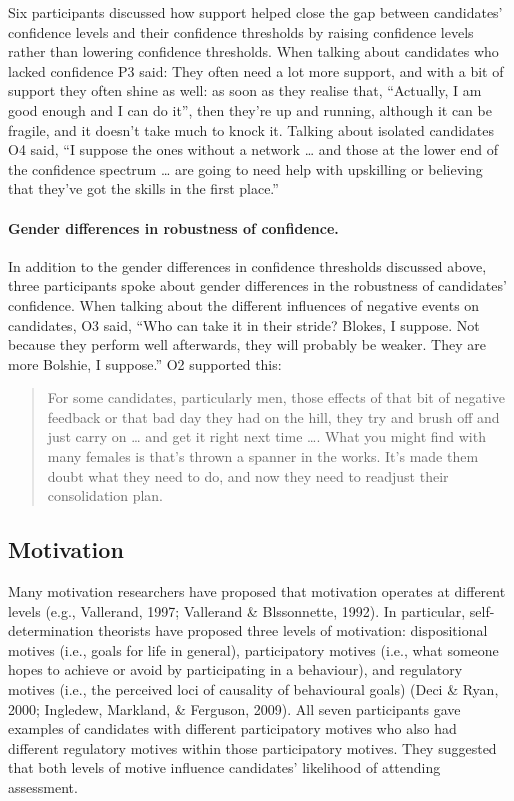 \documentclass[a4paper,]{book}
\let\oldparagraph\paragraph
\renewcommand{\paragraph}[1]{\oldparagraph{#1}\mbox{}}
\begin{document}
Six participants discussed how support helped close the gap between candidates' confidence levels and their confidence thresholds by raising confidence levels rather than lowering confidence thresholds. When talking about candidates who lacked confidence P3 said:
They often need a lot more support, and with a bit of support they often shine as well: as soon as they realise that, ``Actually, I am good enough and I can do it'', then they're up and running, although it can be fragile, and it doesn't take much to knock it.
Talking about isolated candidates O4 said, ``I suppose the ones without a network \ldots{} and those at the lower end of the confidence spectrum \ldots{} are going to need help with upskilling or believing that they've got the skills in the first place.''

\hypertarget{gender-differences-in-robustness-of-confidence.}{%
\paragraph{Gender differences in robustness of confidence.}\label{gender-differences-in-robustness-of-confidence.}}

In addition to the gender differences in confidence thresholds discussed above, three participants spoke about gender differences in the robustness of candidates' confidence. When talking about the different influences of negative events on candidates, O3 said, ``Who can take it in their stride? Blokes, I suppose. Not because they perform well afterwards, they will probably be weaker. They are more Bolshie, I suppose.'' O2 supported this:

\begin{quote}
For some candidates, particularly men, those effects of that bit of negative feedback or that bad day they had on the hill, they try and brush off and just carry on \ldots{} and get it right next time \ldots{}. What you might find with many females is that's thrown a spanner in the works. It's made them doubt what they need to do, and now they need to readjust their consolidation plan.
\end{quote}

\hypertarget{motivation}{%
\subsection{Motivation}\label{motivation}}

Many motivation researchers have proposed that motivation operates at different levels (e.g., Vallerand, 1997; Vallerand \& Blssonnette, 1992). In particular, self-determination theorists have proposed three levels of motivation: dispositional motives (i.e., goals for life in general), participatory motives (i.e., what someone hopes to achieve or avoid by participating in a behaviour), and regulatory motives (i.e., the perceived loci of causality of behavioural goals) (Deci \& Ryan, 2000; Ingledew, Markland, \& Ferguson, 2009). All seven participants gave examples of candidates with different participatory motives who also had different regulatory motives within those participatory motives. They suggested that both levels of motive influence candidates' likelihood of attending assessment.
\end{document}
